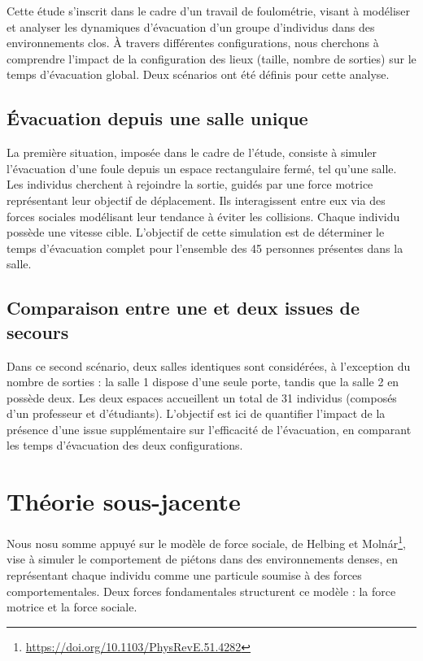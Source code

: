 \documentclass[a4paper,12pt]{article}
\begin{document}
Cette étude s’inscrit dans le cadre d’un travail de foulométrie, visant à modéliser et analyser les dynamiques d’évacuation d’un groupe d’individus dans des environnements clos. À travers différentes configurations, nous cherchons à comprendre l’impact de la configuration des lieux (taille, nombre de sorties) sur le temps d’évacuation global. Deux scénarios ont été définis pour cette analyse.

\subsection{Évacuation depuis une salle unique}

La première situation, imposée dans le cadre de l’étude, consiste à simuler l’évacuation d’une foule depuis un espace rectangulaire fermé, tel qu’une salle. Les individus cherchent à rejoindre la sortie, guidés par une force motrice représentant leur objectif de déplacement. Ils interagissent entre eux via des forces sociales modélisant leur tendance à éviter les collisions. Chaque individu possède une vitesse cible.
L’objectif de cette simulation est de déterminer le temps d’évacuation complet pour l’ensemble des 45 personnes présentes dans la salle.

\subsection{Comparaison entre une et deux issues de secours}

Dans ce second scénario, deux salles identiques sont considérées, à l’exception du nombre de sorties : la salle 1 dispose d’une seule porte, tandis que la salle 2 en possède deux. Les deux espaces accueillent un total de 31 individus (composés d'un professeur et d'étudiants).
L’objectif est ici de quantifier l’impact de la présence d’une issue supplémentaire sur l’efficacité de l’évacuation, en comparant les temps d’évacuation des deux configurations.
\
\section{Théorie sous-jacente}

Nous nosu somme appuyé sur le modèle de force sociale, de Helbing et Molnár\footnote{\url{https://doi.org/10.1103/PhysRevE.51.4282}}, vise à simuler le comportement de piétons dans des environnements denses, en représentant chaque individu comme une particule soumise à des forces comportementales. Deux forces fondamentales structurent ce modèle : la force motrice et la force sociale.
\end{document}
